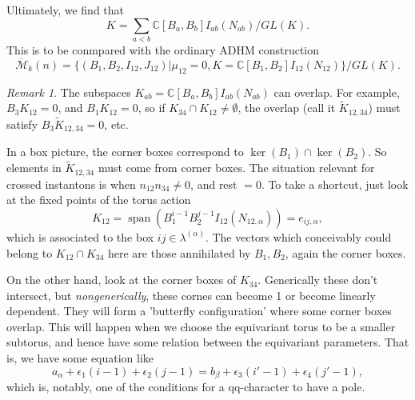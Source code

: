 \documentclass[leqno, openany]{memoir}
\theoremstyle{definition}
\theoremstyle{remark}
\newtheorem{rmk}[thm]{Remark}
\theoremstyle{plain}
\theoremstyle{definition}
\theoremstyle{remark}
\newcommand{\on}[1]{\operatorname{#1}}
\begin{document}
Ultimately, we find that 
\[
K = \sum_{a<b} \mathbb{C}[B_a,B_b] I_{ab}(N_{ab}) /GL(K).
\]
This is to be conmpared with the ordinary ADHM construction 
\[
\overline{\mathcal{M}}_k(n) = \{ (B_1,B_2,I_{12}, J_{12}) | \mu_{12} = 0, K = \mathbb{C}[B_1,B_2]I_{12}(N_{12})\}/GL(K).
\]

\begin{rmk}
The subspaces $K_{ab} = \mathbb{C}[B_a,B_b] I_{ab}(N_{ab})$
can overlap. 
For example, $B_3 K_{12} = 0$, and $B_1 K_{12} = 0$, 
so if $K_{34} \cap K_{12} \neq \emptyset$, the overlap (call it $\tilde{K}_{12,34}$) 
must satisfy $B_3 \tilde{K}_{12,34} = 0$, etc.

In a box picture, the corner boxes correspond to $\ker(B_1) \cap \ker(B_2)$. 
So elements in $\tilde{K}_{12,34}$ must come from corner boxes. 
The situation relevant for crossed instantons is when $n_{12} n_{34} \neq 0$, and rest $= 0$. 
To take a shortcut, just look at the fixed points of the torus action 
\[
K_{12}= \on{span}( B_1^{i-1} B_2^{j-1} I_{12} (N_{12,\alpha})) = e_{ij, \alpha},
\]
which is associated to the box $ij \in \lambda^{(\alpha)}$.
The vectors which conceivably could belong to $K_{12} \cap K_{34}$ here are those annihilated by $B_1,B_2$,
again the corner boxes. 

On the other hand, look at the corner boxes of $K_{34}$. 
Generically these don't intersect, but \emph{nongenerically},
these cornes can become 1 or become linearly dependent. 
They will form a 'butterfly configuration' where some corner boxes overlap. 
This will happen when we choose the equivariant torus to be a smaller subtorus, and 
hence have some relation between the equivariant parameters. 
That is, we have some equation like 
\[
a_\alpha + \epsilon_1 (i -1) + \epsilon_2(j-1) = b_\beta + \epsilon_3(i' - 1) + \epsilon_4(j' - 1),
\]
which is, notably, one of the conditions for a qq-character to have a pole. 
\end{rmk}
\end{document}

